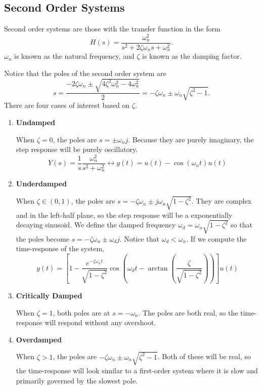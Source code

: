 \subsection{Second Order Systems}
\begin{definition}
  Second order systems are those with the transfer function in the form
  \[
	H(s) = \frac{\omega_n^2}{s^2+2\zeta\omega_ns+\omega_n^2}.
  \]
  $\omega_n$ is known as the natural frequency, and $\zeta$ is known as the damping factor.
  \label{defn:second-order}
\end{definition}
Notice that the poles of the second order system are
\[
  s = \frac{-2\zeta\omega_n \pm \sqrt{4\zeta^2\omega^2_n-4\omega^2_n}}{2} = -\zeta\omega_n \pm \omega_n\sqrt{\zeta^2 - 1}.
\]
There are four cases of interest based on $\zeta$.
\begin{enumerate}
  \item \textbf{Undamped}

	When $\zeta=0$, the poles are $s = \pm \omega_n j$. Because they are purely imaginary, the step response will be purely oscillatory.
	\[
	  Y(s) = \frac{1}{s}\frac{\omega_n^2}{s^2+\omega_n^2} \leftrightarrow y(t) = u(t) - \cos(\omega_n t)u(t)
	\]
  \item \textbf{Underdamped}

	When $\zeta\in(0, 1)$, the poles are $s = -\zeta\omega_n\pm j\omega_n\sqrt{1-\zeta^2}$. They are complex and in the left-half plane, so the step response will be a exponentially decaying sinusoid.
	We define the damped frequency $\omega_d = \omega_n\sqrt{1-\zeta^2}$ so that the poles become $s=-\zeta\omega_n \pm \omega_dj$. Notice that $\omega_d < \omega_n$.
	If we compute the time-response of the system,
	\[
	  y(t) = \left[ 1 - \frac{e^{-\zeta\omega_nt}}{\sqrt{1-\zeta^2}}\cos\left(\omega_d t - \arctan\left( \frac{\zeta}{\sqrt{1-\zeta^2}} \right)\right)\right]u(t)
	\]
  \item \textbf{Critically Damped}

	When $\zeta=1$, both poles are at $s=-\omega_n$. The poles are both real, so the time-response will respond without any overshoot.
  \item \textbf{Overdamped}

	When $\zeta>1$, the poles are $-\zeta\omega_n\pm \omega_n\sqrt{\zeta^2-1}$. Both of these will be real, so the time-response will look similar to a first-order system where it is slow and primarily governed by the slowest pole.
\end{enumerate}
